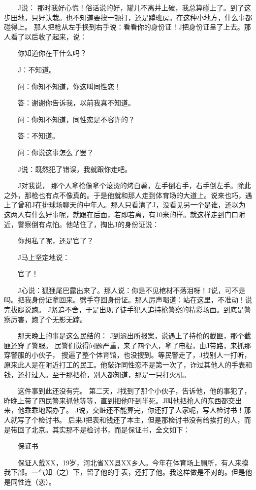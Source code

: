  　　J说： 那时我好心慌！俗话说的好，罐儿不离井上破，我总算碰上了。到了这步田地，只好认栽。也不知道要挨一顿打，还是蹲班房。在这种小地方，什么事都碰得上。 那人把枪从左手换到右手说：看看你的身份证！J把身份证呈了上去。那人看了以后收了起来，说： 
 
 　　你知道你在干什么吗？ 
 
 　　J：不知道。 
 
 　　问：你知不知道，你这叫同性恋！ 
 
 　　答：谢谢你告诉我，以前我真不知道。 
 
 　　问：你知不知道，同性恋是不容许的？ 
 
 　　答：不知道。 
 
 　　问：你说这事怎么了罢？ 
 
 　　J说：既然犯了错误，我就跟你走吧。 
 
 　　J对我说， 那个人拿枪像拿个滚烫的烤白薯，左手倒右手，右手倒左手。除此之外，那枪也有点不像真的。于是他就和那人走到体育场的大道上。说来也巧，遇上了曾和J在排球场聊天的中年人。那人只看清了J，没看见另一个是谁，还以为这两人有什么好事呢，就跟在后面，若即若离，有10米的样。就这样走到门口附近，警察倒有点怕。他站住了，掏出J的身份证说： 
 
 　　你想私了呢，还是官了？ 
 
 　　J马上坚定地说： 
 
 　　官了！ 
 
 　　J心说：狐狸尾巴露出来了。那人说：你是不见棺材不落泪呀！J说，可不是吗。把我身份证拿回来。劈手夺回身份证。那人厉声喝道：站在这里，不准动！说完拔腿说跑。 J紧追不舍，于是出现了徒手犯人追持枪警察的精彩场面。到底是警察厉害，跑了个无影无踪。 
 
 　　那天晚上的事是这么民结的： J到派出所报案，说遇上了持枪的截匪，那个截匪还穿了警服。 民警们觉得问题严重，来了四个人，拿了电棍，由J带路，来抓那穿警服的小伙子， 搜遍了整个体育馆，也没搜到。等民警走了，J找别人一打听，原来此人是在附近打工的民工。他敲诈同性恋不是第一次了，诈过其他人的手表和钱，还打过人。至于那把枪，别人都知道，那是一只打火机。 
 
 　　这件事到此还没有完。 第二天，J找到了那个小伙子，告诉他，他的事犯了，昨晚上带了四民警来抓他等等，直到把他吓到半死。J叫他把抢人的东西都交出来，他乖乖地照办了。 J说，交赃还不能算完，你还打了人家呢，写人检讨书！那人就写了个检讨书。 后来J把表和钱还了本主，但是那检讨书没有给挨打的人，而是带回了北京。其实那不是检讨书，而是保证书，全文如下： 
 
 　　保证书 
 
 　　保证人戴XX，19岁，河北省XX县XX乡人。今年在体育场上厕所，有人来摸我下部。一气知（之）下，留了他的手表，还打了他。我这样做是不对的。但是他是同性连（恋）。 
 
